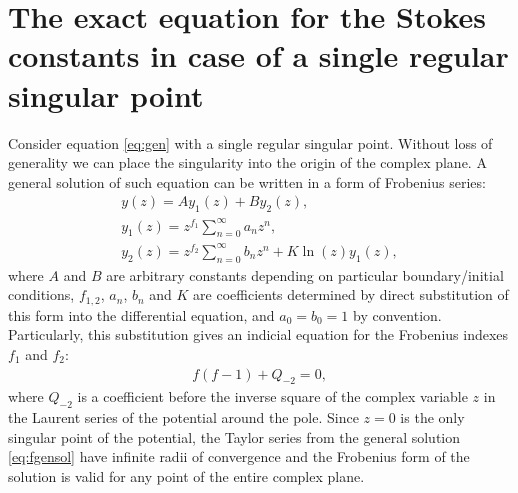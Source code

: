 \documentclass[aip,jmp,reprint]{revtex4-1}
\begin{document}
\section{The exact equation for the Stokes constants in case of a single regular singular point \label{sec:frob}}
Consider equation \eqref{eq:gen} with a single regular singular point. Without loss of generality
we can place the singularity into the origin of the complex plane. A general solution of such equation 
can be written in a form of Frobenius series:
\begin{eqnarray}
y(z) = A y_1(z)+B y_2(z), \\
y_1(z) = z^{f_1}\sum_{n=0}^{\infty}{a_n z^n}, \\
y_2(z) = z^{f_2}\sum_{n=0}^{\infty}{b_n z^n} + K \ln(z) y_1(z),    \label{eq:fgensol}
\end{eqnarray}
where $A$ and $B$ are arbitrary constants depending on particular boundary/initial conditions,  
$f_{1,2}$, $a_n$, $b_n$ and $K$ are coefficients determined by direct substitution of this form into the 
differential equation, and $a_0=b_0=1$ by convention. Particularly, this substitution gives
an indicial equation for the Frobenius indexes $f_1$ and $f_2$:
\begin{eqnarray}
f(f-1)+Q_{-2}=0,   \label{eq:indicial}
\end{eqnarray}
where $Q_{-2}$ is a coefficient before the inverse square of the complex variable $z$ in the Laurent series
of the potential around the pole. Since $z=0$ is the only singular point of the potential, the Taylor 
series from the general solution \eqref{eq:fgensol} have infinite radii of convergence and the
Frobenius form of the solution is valid for any point of the entire complex plane.
\end{document}
